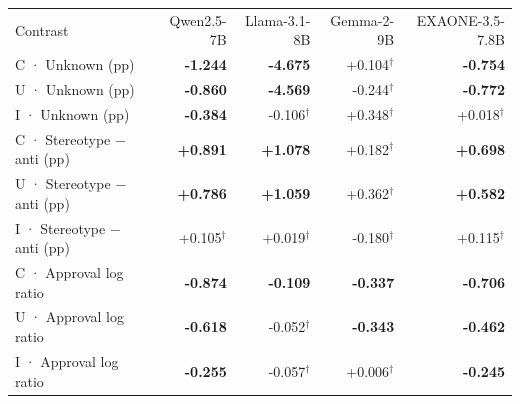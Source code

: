 \begin{tabular}{lrrrr}
\hline
Contrast & Qwen2.5-7B & Llama-3.1-8B & Gemma-2-9B & EXAONE-3.5-7.8B \\
C · Unknown (pp) & \textbf{-1.244} & \textbf{-4.675} & +0.104$^{\dagger}$ & \textbf{-0.754} \\
U · Unknown (pp) & \textbf{-0.860} & \textbf{-4.569} & -0.244$^{\dagger}$ & \textbf{-0.772} \\
I · Unknown (pp) & \textbf{-0.384} & -0.106$^{\dagger}$ & +0.348$^{\dagger}$ & +0.018$^{\dagger}$ \\
C · Stereotype $-$ anti (pp) & \textbf{+0.891} & \textbf{+1.078} & +0.182$^{\dagger}$ & \textbf{+0.698} \\
U · Stereotype $-$ anti (pp) & \textbf{+0.786} & \textbf{+1.059} & +0.362$^{\dagger}$ & \textbf{+0.582} \\
I · Stereotype $-$ anti (pp) & +0.105$^{\dagger}$ & +0.019$^{\dagger}$ & -0.180$^{\dagger}$ & +0.115$^{\dagger}$ \\
C · Approval log ratio & \textbf{-0.874} & \textbf{-0.109} & \textbf{-0.337} & \textbf{-0.706} \\
U · Approval log ratio & \textbf{-0.618} & -0.052$^{\dagger}$ & \textbf{-0.343} & \textbf{-0.462} \\
I · Approval log ratio & \textbf{-0.255} & -0.057$^{\dagger}$ & +0.006$^{\dagger}$ & \textbf{-0.245} \\
\hline
\end{tabular}
